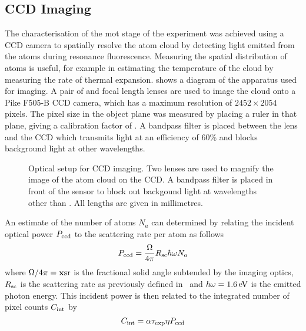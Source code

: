 \subsection{CCD Imaging}\label{sec:imaging}
The characterisation of the \ac{mot} stage of the experiment was achieved using a CCD camera to spatially resolve the atom cloud by detecting light emitted from the atoms during resonance fluorescence. Measuring the spatial distribution of atoms is useful, for example in estimating the temperature of the cloud by measuring the rate of thermal expansion.  shows a diagram of the apparatus used for imaging. A pair of  and  focal length lenses are used to image the cloud onto a Pike F505-B CCD camera, which has a maximum resolution of \(2452 \times 2054\) pixels. The pixel size in the object plane was measured by placing a ruler in that plane, giving a calibration factor of . A bandpass filter is placed between the lens and the CCD which transmits  light at an efficiency of 60\% and blocks background light at other wavelengths. 
\begin{figure}
    \centering
    \def\svgwidth{
    0.6\textwidth}
    
    \caption[Optical setup for CCD imaging]{Optical setup for CCD imaging. Two lenses are used to magnify the image of the atom cloud on the CCD. A bandpass filter is placed in front of the sensor to block out backgound light at wavelengths other than . All lengths are given in millimetres.}
    \label{fig:imaging_optics}
\end{figure}
\par\noindent
An estimate of the number of atoms \(N_a\) can determined by relating the incident optical power \(P_\textnormal{ccd}\) to the scattering rate per atom as follows
\begin{equation}
    P_\textnormal{ccd} = \frac{\Omega}{4\pi}  R_\textnormal{sc}  \hbar \omega N_a
\end{equation}
where $\Omega/4\pi = \textbf{x}\sivalue{}{\steradian}$ is the fractional solid angle subtended by the imaging optics, \(R_\textnormal{sc}\) is the scattering rate as previously defined in~ and \(\hbar \omega = \sivalue{1.6}{\electronvolt}\) is the emitted photon energy. This incident power is then related to the integrated number of pixel counts \(C_\textnormal{int}\) by 
\begin{equation}
    C_\textnormal{int} = \alpha \tau_\textnormal{exp} \eta P_\textnormal{ccd}
\end{equation}
